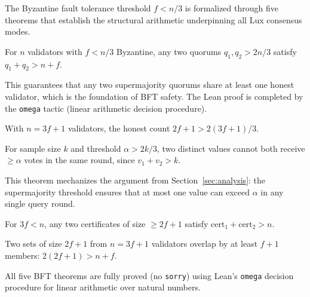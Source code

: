 The Byzantine fault tolerance threshold $f < n/3$ is formalized through five theorems
that establish the structural arithmetic underpinning all Lux consensus modes.

\begin{theorem}
\label{thm:formal-quorum}
For $n$ validators with $f < n/3$ Byzantine,
any two quorums $q_1, q_2 > 2n/3$ satisfy $q_1 + q_2 > n + f$.
\end{theorem}

This guarantees that any two supermajority quorums share at least one honest validator,
which is the foundation of BFT safety. The Lean proof is completed by the \texttt{omega}
tactic (linear arithmetic decision procedure).

\begin{theorem}
\label{thm:formal-honest}
With $n = 3f + 1$ validators, the honest count $2f + 1 > 2(3f+1)/3$.
\end{theorem}

\begin{theorem}
\label{thm:formal-alpha}
For sample size $k$ and threshold $\alpha > 2k/3$, two distinct values cannot both
receive $\geq \alpha$ votes in the same round, since $v_1 + v_2 > k$.
\end{theorem}

This theorem mechanizes the argument from Section~\ref{sec:analysis}: the supermajority
threshold ensures that at most one value can exceed $\alpha$ in any single query round.

\begin{theorem}
For $3f < n$, any two certificates of size $\geq 2f+1$ satisfy $\text{cert}_1 + \text{cert}_2 > n$.
\end{theorem}

\begin{theorem}
Two sets of size $2f+1$ from $n = 3f+1$ validators overlap by at least $f+1$ members:
$2(2f+1) > n + f$.
\end{theorem}

All five BFT theorems are fully proved (no \texttt{sorry}) using Lean's \texttt{omega} decision
procedure for linear arithmetic over natural numbers.

